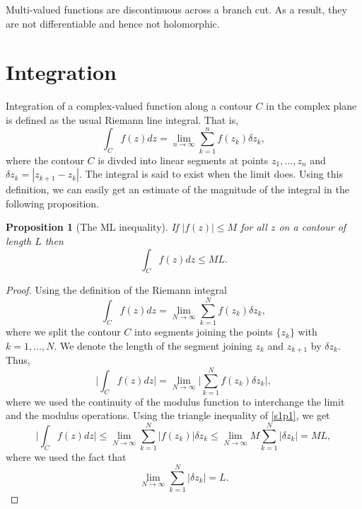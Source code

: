 \documentclass{article}
\theoremstyle{plain}
\numberwithin{thm}{section}
\theoremstyle{plain}
\newtheorem{prop}{Proposition}
\numberwithin{prop}{section}
\theoremstyle{plain}
\numberwithin{prop}{section}
\theoremstyle{definition}
\numberwithin{defn}{section}
\theoremstyle{remark}
\numberwithin{equation}{section}
\begin{document}
Multi-valued functions are discontinuous across a branch cut. As a result, they
are not differentiable and hence not holomorphic.

\section{Integration}\label{s4}
Integration of a complex-valued function along a contour $C$ in the complex
plane is defined as the usual Riemann line integral. That is,
\[
\int_C f(z)dz = \lim_{n \rightarrow \infty}\sum_{k=1}^n f(z_k)\delta z_k,
\]
where the contour $C$ is divded into linear segments at points $z_1, \ldots,
z_n$ and $\delta z_k = |z_{k+1} - z_k|$. The integral is said to exist when the 
limit does. Using this definition, we can easily get an estimate of the 
magnitude of the integral in the following proposition.

\begin{prop}[The ML inequality]\label{s4p1}
If $|f(z)| \le M$ for all $z$ on a contour of length $L$ then 
\[
\int_C f(z)dz \le ML.
\]
\end{prop}
\begin{proof}
Using the definition of the  Riemann integral
\[
\int_C f(z)dz = \lim_{N \rightarrow \infty}\sum_{k=1}^Nf(z_k)\delta z_k,
\]
where we split the contour $C$ into segments joining the points $\{z_k\}$ with
$k = 1, \ldots, N$. We denote the length of the segment joining $z_k$ and 
$z_{k+1}$ by $\delta z_k$. Thus,
\[
\Big|\int_C f(z)dz\Big| = 
\lim_{N \rightarrow \infty}\Big|\sum_{k=1}^N f(z_k)\delta z_k\Big|,
\]
where we used the continuity of the modulus function to interchange the limit
and the modulus operations. Using the triangle inequality of \ref{s1p1}, we get
\[
\Big|\int_C f(z)dz\Big| \le 
\lim_{N \rightarrow \infty}\sum_{k=1}^N|f(z_k)|\delta z_k
\le \lim_{N \rightarrow \infty}M \sum_{k=1}^N |\delta z_k| = ML,
\]
where we used the fact that
\[
\lim_{N \rightarrow \infty}\sum_{k=1}^N |\delta z_k| = L.
\]
\end{proof}
\end{document}
